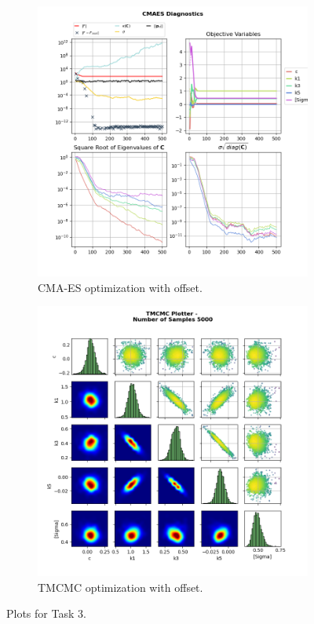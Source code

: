 \documentclass{article}
\begin{document}
\begin{figure}[htb]
        \begin{subfigure}[b]{0.5\linewidth}
            \includegraphics[width=0.95\linewidth]{img/task3_d_cmaes.png}
            \caption{CMA-ES optimization with offset.}
        \end{subfigure}
        \begin{subfigure}[b]{0.5\linewidth}
            \includegraphics[width=0.95\linewidth]{img/task3_d.png}
            \caption{TMCMC optimization with offset.}
        \end{subfigure}

        \caption{Plots for Task 3.}
        \label{fig:task3}
        
    \end{figure}
\end{document}
